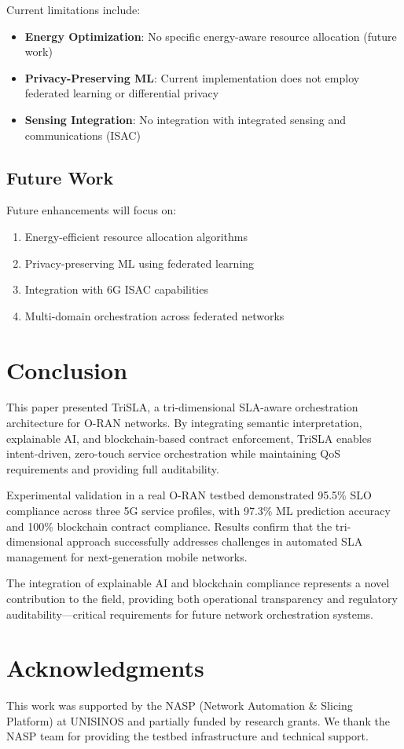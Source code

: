 \documentclass[review]{elsarticle}
\begin{document}
Current limitations include:
\begin{itemize}
    \item \textbf{Energy Optimization}: No specific energy-aware resource allocation (future work)
    \item \textbf{Privacy-Preserving ML}: Current implementation does not employ federated learning or differential privacy
    \item \textbf{Sensing Integration}: No integration with integrated sensing and communications (ISAC)
\end{itemize}

\subsection{Future Work}

Future enhancements will focus on:
\begin{enumerate}
    \item Energy-efficient resource allocation algorithms
    \item Privacy-preserving ML using federated learning
    \item Integration with 6G ISAC capabilities
    \item Multi-domain orchestration across federated networks
\end{enumerate}

\section{Conclusion}

This paper presented TriSLA, a tri-dimensional SLA-aware orchestration architecture for O-RAN networks. By integrating semantic interpretation, explainable AI, and blockchain-based contract enforcement, TriSLA enables intent-driven, zero-touch service orchestration while maintaining QoS requirements and providing full auditability.

Experimental validation in a real O-RAN testbed demonstrated 95.5\% SLO compliance across three 5G service profiles, with 97.3\% ML prediction accuracy and 100\% blockchain contract compliance. Results confirm that the tri-dimensional approach successfully addresses challenges in automated SLA management for next-generation mobile networks.

The integration of explainable AI and blockchain compliance represents a novel contribution to the field, providing both operational transparency and regulatory auditability—critical requirements for future network orchestration systems.

\section*{Acknowledgments}

This work was supported by the NASP (Network Automation \& Slicing Platform) at UNISINOS and partially funded by research grants. We thank the NASP team for providing the testbed infrastructure and technical support.



\end{document}
